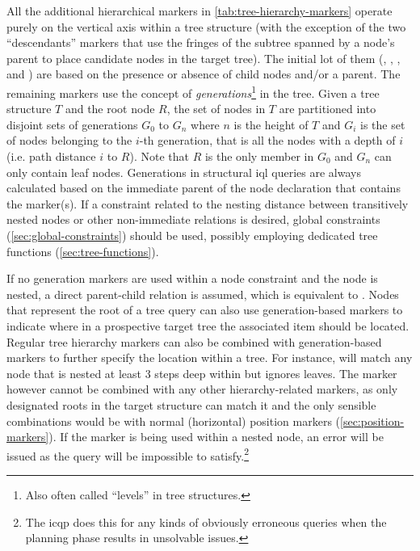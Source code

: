 \documentclass[11pt,a4paper]{report}
\begin{document}
All the additional hierarchical markers in \cref{tab:tree-hierarchy-markers} operate purely on the vertical axis within a tree structure (with the exception of the two ``descendants'' markers that use the fringes of the subtree spanned by a node's parent to place candidate nodes in the target tree).
The initial lot of them (, , ,  and ) are based on the presence or absence of child nodes and/or a parent.
The remaining markers use the concept of \textit{generations}\footnote{Also often called ``levels'' in tree structures.} in the tree.
Given a tree structure $T$ and the root node $R$, the set of nodes in $T$ are partitioned into disjoint sets of generations $G_0$ to $G_n$ where $n$ is the height of $T$ and $G_i$ is the set of nodes belonging to the $i$-th generation, that is all the nodes with a depth of $i$ (i.e. path distance $i$ to $R$). 
Note that $R$ is the only member in $G_0$ and $G_n$ can only contain leaf nodes.
Generations in structural \ac{iql} queries are always calculated based on the immediate parent of the node declaration that contains the marker(s).
If a constraint related to the nesting distance between transitively nested nodes or other non-immediate relations is desired, global constraints (\ref{sec:global-constraints}) should be used, possibly employing dedicated tree functions (\ref{sec:tree-functions}).

If no generation markers are used within a node constraint and the node is nested, a direct parent-child relation is assumed, which is equivalent to .
Nodes that represent the root of a tree query can also use generation-based markers to indicate where in a prospective target tree the associated item should be located.
Regular tree hierarchy markers can also be combined with generation-based markers to  further specify the location within a tree.
For instance,  will match any node that is nested at least 3 steps deep within  but ignores leaves.
The  marker however cannot be combined with any other hierarchy-related markers, as only designated roots in the target structure can match it and the only sensible combinations would be with normal (horizontal) position markers (\ref{sec:position-markers}).
If the  marker is being used within a nested node, an error will be issued as the query will be impossible to satisfy.\footnote{The \ac{icqp} does this for any kinds of obviously erroneous queries when the planning phase results in unsolvable issues.}
\end{document}
